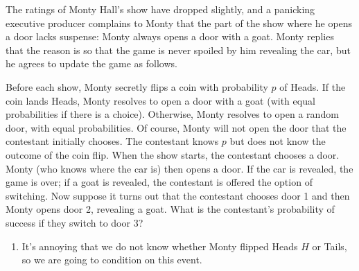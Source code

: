 

\setcounter{theorem}{18}
\begin{exercise}[BH.2.41]
  The ratings of Monty Hall's show have dropped slightly, and a panicking executive producer complains to Monty that the part of the show where he opens a door lacks suspense: Monty always opens a door with a goat. Monty replies that the reason is so that the game is never spoiled by him revealing the car, but he agrees to update the game as follows.
	
	Before each show, Monty secretly flips a coin with probability $p$ of Heads. If the coin lands Heads, Monty resolves to open a door with a goat (with equal probabilities if there is a choice). Otherwise, Monty resolves to open a random door, with equal probabilities. Of course, Monty will not open the door that the contestant initially chooses. The contestant knows $p$ but does not know the outcome of the coin flip. When the show starts, the contestant chooses a door. Monty (who knows where the car is) then opens a door. If the car is revealed, the game is over; if a goat is revealed, the contestant is offered the option of switching. Now suppose it turns out that the contestant chooses door 1 and then Monty opens door 2, revealing a goat. What is the contestant's probability of success if they switch to door 3?
\begin{solution}
	\begin{enumerate}
		\item It's annoying that we do not know whether Monty flipped Heads $H$ or Tails, so we are going to condition on this event.  
	

\end{enumerate}
\end{solution}
\end{exercise}
